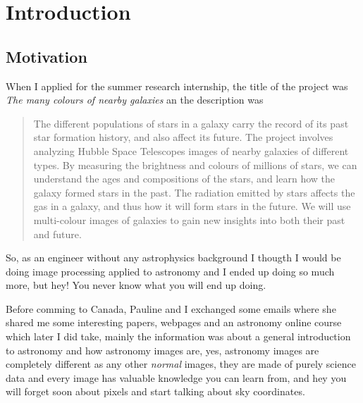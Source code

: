 \documentclass[11pt,fleqn]{book} %
\begin{document}

\pagestyle{fancy} %



\chapter{Introduction}

\section{Motivation}
When I applied for the summer research internship, the title of the project was \emph{The many colours of nearby galaxies} an the description was
\begin{quote}
The different populations of stars in a galaxy carry the record of its past star formation history, and also affect its future. The project involves  analyzing Hubble Space Telescopes images of nearby galaxies of different types. By measuring the brightness and colours of millions of stars, we can understand the ages and compositions of the stars, and learn how the galaxy formed stars in the past. The radiation emitted by stars affects the gas in a galaxy, and thus how it will form stars in the future. We will use multi-colour images of galaxies to gain new insights into both their past and future.
\end{quote}

So, as an engineer without any astrophysics background I thougth I would be doing image processing applied to astronomy and I ended up doing so much more, but hey! You never know what you will end up doing.

Before comming to Canada, Pauline and I exchanged some emails where she shared me some interesting papers, webpages and an astronomy online course which later I did take, mainly the information was about a general introduction to astronomy and how astronomy images are, yes, astronomy images are completely different as any other \emph{normal} images, they are made of purely science data and every image has valuable knowledge you can learn from, and hey you will forget soon about pixels and start talking about sky coordinates.
\end{document}
